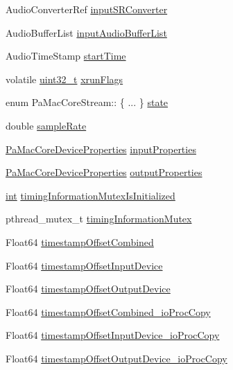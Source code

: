 \begin{DoxyCompactItemize}
\item 
Audio\+Converter\+Ref \hyperlink{struct_pa_mac_core_stream_ab3d6f024b40670367b5bbbe1444cba92}{input\+S\+R\+Converter}
\item 
Audio\+Buffer\+List \hyperlink{struct_pa_mac_core_stream_aa214b3f78a40dd23797a512b0892a098}{input\+Audio\+Buffer\+List}
\item 
Audio\+Time\+Stamp \hyperlink{struct_pa_mac_core_stream_aa9eec45ab4d032a62a5edf9815aa95c5}{start\+Time}
\item 
volatile \hyperlink{lib-src_2ffmpeg_2win32_2stdint_8h_a6eb1e68cc391dd753bc8ce896dbb8315}{uint32\+\_\+t} \hyperlink{struct_pa_mac_core_stream_af65db3bdd18d4356f16fe5c2b23f7d5d}{xrun\+Flags}
\item 
enum Pa\+Mac\+Core\+Stream\+:: \{ ... \}  \hyperlink{struct_pa_mac_core_stream_a18df3b14e087124f9da12f49589a4c87}{state}
\item 
double \hyperlink{struct_pa_mac_core_stream_a3e945d299bff5c01d6e8a4f6bd8dfffb}{sample\+Rate}
\item 
\hyperlink{struct_pa_mac_core_device_properties}{Pa\+Mac\+Core\+Device\+Properties} \hyperlink{struct_pa_mac_core_stream_a784e07f3c2e4f2e03989aab2614687b1}{input\+Properties}
\item 
\hyperlink{struct_pa_mac_core_device_properties}{Pa\+Mac\+Core\+Device\+Properties} \hyperlink{struct_pa_mac_core_stream_a7d1be4951510dd36b84abd1cc7daf49a}{output\+Properties}
\item 
\hyperlink{xmltok_8h_a5a0d4a5641ce434f1d23533f2b2e6653}{int} \hyperlink{struct_pa_mac_core_stream_a94404e181cea0bc1d2c82b2e6f541366}{timing\+Information\+Mutex\+Is\+Initialized}
\item 
pthread\+\_\+mutex\+\_\+t \hyperlink{struct_pa_mac_core_stream_ab03af1e2679f505b0ab8ad629a0b4a34}{timing\+Information\+Mutex}
\item 
Float64 \hyperlink{struct_pa_mac_core_stream_a169f40774042f35654987a0d5daa369d}{timestamp\+Offset\+Combined}
\item 
Float64 \hyperlink{struct_pa_mac_core_stream_a478d46d9d93bdc6d3cdb2009236c1d9e}{timestamp\+Offset\+Input\+Device}
\item 
Float64 \hyperlink{struct_pa_mac_core_stream_a81525a1ff3c1cb96a57d44c5ca70f7c4}{timestamp\+Offset\+Output\+Device}
\item 
Float64 \hyperlink{struct_pa_mac_core_stream_a8835149b249b0d65891cb7b7104bbd53}{timestamp\+Offset\+Combined\+\_\+io\+Proc\+Copy}
\item 
Float64 \hyperlink{struct_pa_mac_core_stream_a5214bc58179dd3ab933567bff3eb0c71}{timestamp\+Offset\+Input\+Device\+\_\+io\+Proc\+Copy}
\item 
Float64 \hyperlink{struct_pa_mac_core_stream_a4eb660a54787d8965d59a774b21ab454}{timestamp\+Offset\+Output\+Device\+\_\+io\+Proc\+Copy}
\end{DoxyCompactItemize}


